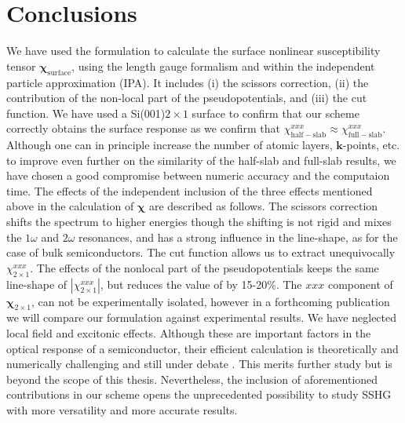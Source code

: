 
\section{Conclusions}

We have used the formulation to calculate the surface nonlinear susceptibility
tensor $\boldsymbol{\chi}_{\mathrm{surface}}$, using the length gauge formalism
and within the independent particle approximation (IPA). It includes (i) the
scissors correction, (ii) the contribution of the non-local part of the
pseudopotentials, and (iii) the cut function. We have used a Si(001)$2\times 1$
surface to confirm that our scheme correctly obtains the surface response as we
confirm that $\chi_{\mathrm{half-slab}}^{xxx} \approx
\chi_{\mathrm{full-slab}}^{xxx}$. Although one can in principle increase the
number of atomic layers, $\mathbf{k}$-points, etc. to improve even further on
the similarity of the half-slab and full-slab results, we have chosen a good
compromise between numeric accuracy and the computaion time. The effects of the
independent inclusion of the three effects mentioned above in the calculation of
$\boldsymbol{\chi}$ are described as follows. The scissors correction shifts the
spectrum to higher energies though the shifting is not rigid and mixes the
$1\omega$ and $2\omega$ resonances, and has a strong influence in the
line-shape, as for the case of bulk semiconductors.\cite{luppiJCP10, luppiPRB10,
leitsmannPRB05} The cut function allows us to extract unequivocally
$\chi^{xxx}_{2\times 1}$. The effects of the nonlocal part of the
pseudopotentials keeps the same line-shape of $|\chi^{xxx}_{2\times 1}|$, but
reduces the value of by 15-20\%. The $xxx$ component of
$\boldsymbol{\chi}_{2\times 1}$, can not be experimentally isolated, however in
a forthcoming publication we will compare our formulation against experimental
results. We have neglected local field and excitonic effects. Although these are
important factors in the optical response of a semiconductor, their efficient
calculation is theoretically and numerically challenging and still under debate
\cite{beyond}. This merits further study but is beyond the scope of this thesis.
Nevertheless, the inclusion of aforementioned contributions in our scheme opens
the unprecedented possibility to study SSHG with more versatility and more
accurate results.

